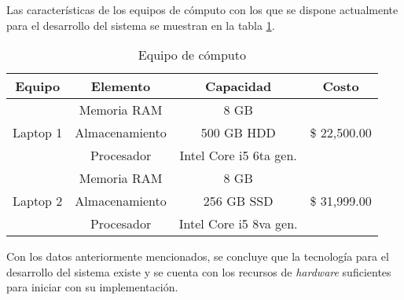 Las características de los equipos de cómputo con los que se dispone actualmente para el desarrollo del sistema se muestran en la tabla \ref{tab:hw_devices}.

\begin{table}[h!]
    \begin{tabular}{|c|c|c|c|}
        \hline
        Equipo & Elemento & Capacidad & Costo\\ \hline
        \multirow{3}{*}{Laptop 1} & Memoria RAM & 8 GB & \\
        & Almacenamiento & 500 GB HDD & \$ 22,500.00\\
        & Procesador & Intel Core i5 6ta gen. &\\ \hline
        \multirow{3}{*}{Laptop 2} & Memoria RAM & 8 GB & \\
        & Almacenamiento & 256 GB SSD & \$ 31,999.00\\
        & Procesador & Intel Core i5 8va gen. &\\ \hline
    \end{tabular}
    \caption{Equipo de cómputo}
    \label{tab:hw_devices}
\end{table}


Con los datos anteriormente mencionados, se concluye que la tecnología para el desarrollo del sistema existe y se cuenta con los recursos de \textit{hardware} suficientes para iniciar con su implementación.